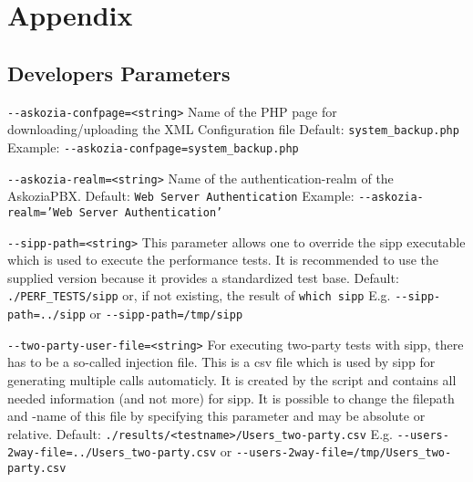 \section{Appendix}
\label{sec:appendix}

\subsection{Developers Parameters}%
\begin {description}

\item {\texttt{-{}-askozia-confpage=<string>}} \newline
Name of the PHP page for downloading/uploading the XML Configuration file
\newline Default: \texttt{system\_backup.php}
\newline Example: \texttt{-{}-askozia-confpage=system\_backup.php}

\item {\texttt{-{}-askozia-realm=<string>}} \newline
Name of the authentication-realm of the AskoziaPBX.
\newline Default: \texttt{Web Server Authentication}
\newline Example: \texttt{-{}-askozia-realm='Web Server Authentication'}

\item {\texttt{-{}-sipp-path=<string>}} \newline
This parameter allows one to override the sipp executable which is used to execute the performance tests.
It is recommended to use the supplied version because it provides a standardized test base.
\newline Default: \texttt{./PERF\_TESTS/sipp} or, if not existing, the result of \texttt{which sipp}
\newline E.g. \texttt{-{}-sipp-path=../sipp} or \texttt{-{}-sipp-path=/tmp/sipp}

\item {\texttt{-{}-two-party-user-file=<string>}} \newline
For executing two-party tests with sipp, there has to be a so-called injection file.
This is a csv file which is used by sipp for generating multiple calls automaticly.
It is created by the script and contains all needed information (and not more)
for sipp. It is possible to change the filepath and -name of this file by specifying
this parameter and may be absolute or relative.
\newline Default: \texttt{./results/<testname>/Users\_two-party.csv}
\newline E.g. \texttt{-{}-users-2way-file=../Users\_two-party.csv}
\newline or \texttt{-{}-users-2way-file=/tmp/Users\_two-party.csv}


\end{description}

